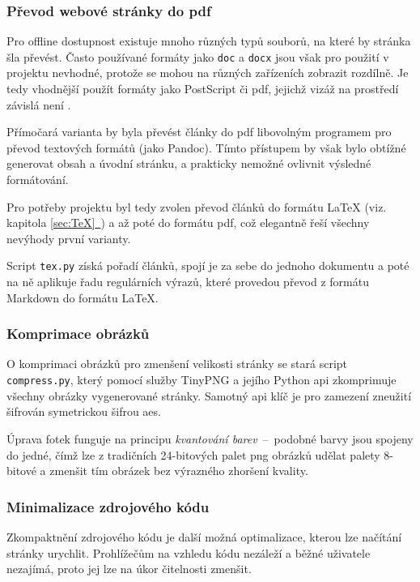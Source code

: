 \documentclass[a4paper, 12pt]{article}
\newcommand*{\fullref}[1]{\hyperref[{#1}]{\ref*{#1}~\nameref*{#1}}}
\begin{document}
  \subsubsection{Převod webové stránky do \acrshort{pdf}} \label{sec:Převod webové stránky do PDF}
  Pro offline dostupnost existuje mnoho různých typů souborů, na které by stránka šla převést. Často používané formáty jako \texttt{doc} a \texttt{docx} jsou však pro použití v projektu nevhodné, protože se mohou na různých zařízeních zobrazit rozdílně. Je tedy vhodnější použít formáty jako PostScript či \gls{pdf}, jejichž vizáž na prostředí závislá není \cite{history-of-pdf}.

  Přímočará varianta by byla převést články do \gls{pdf} libovolným programem pro převod textových formátů (jako Pandoc). Tímto přístupem by však bylo obtížné generovat obsah a úvodní stránku, a prakticky nemožné ovlivnit výsledné formátování.

  Pro potřeby projektu byl tedy zvolen převod článků do formátu \LaTeX{} (viz. kapitola \fullref{sec:TeX}) a až poté do formátu \gls{pdf}, což elegantně řeší všechny nevýhody první varianty.

  Script \texttt{tex.py} získá pořadí článků, spojí je za sebe do jednoho dokumentu a poté na ně aplikuje řadu regulárních výrazů, které provedou převod z formátu Markdown do formátu \LaTeX.


  \subsubsection{Komprimace obrázků}
  O komprimaci obrázků pro zmenšení velikosti stránky se stará script \texttt{compress.py}, který pomocí služby TinyPNG a jejího Python \gls{api} zkomprimuje všechny obrázky vygenerované stránky. Samotný \gls{api} klíč je pro zamezení zneužití šifrován symetrickou šifrou \gls{aes}.

  Úprava fotek funguje na principu \emph{kvantování barev}~--~podobné barvy jsou spojeny do jedné, čímž lze z tradičních 24-bitových palet \gls{png} obrázků udělat palety 8-bitové a zmenšit tím obrázek bez výrazného zhoršení kvality.


  \subsubsection{Minimalizace zdrojového kódu}
  Zkompaktnění zdrojového kódu je další možná optimalizace, kterou lze načítání stránky urychlit. Prohlížečům na vzhledu kódu nezáleží a běžné uživatele nezajímá, proto jej lze na úkor čitelnosti zmenšit.
\end{document}
